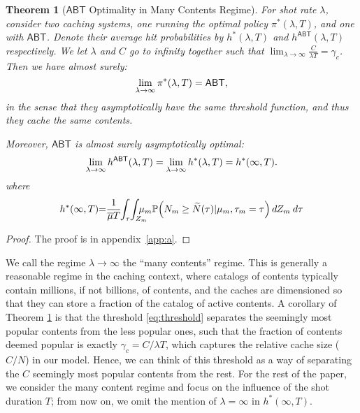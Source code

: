 \documentclass[10pt, conference, letterpaper]{IEEEtran}
\newcommand{\ABT}{\textsf{ABT}}
\newcommand{\prob}[1]{\mathbb{P}\!\left(#1\right)}
\newtheorem{theorem}{Theorem}
\begin{document}
\begin{theorem}[$\textsf{ABT}$ Optimality in  Many Contents Regime]\label{th:ABT}
For shot rate $\lambda$, consider two caching systems, one running the optimal policy $\pi^*(\lambda,T)$, and one with $\ABT$. Denote their average hit probabilities by $h^*(\lambda,T)$ and $h^{\ABT}(\lambda,T)$ respectively.
We let $\lambda$ and $C$ go to infinity together such that $\lim_{\lambda\to\infty}\frac{C}{\lambda T}=\gamma_c$. 
Then we have almost surely: \vspace{-0.09in}
\[
\lim_{\lambda\to\infty}\pi^*(\lambda,T)=\ABT,\vspace{-0.08in}
\]
in the sense that they asymptotically have the same threshold function, and thus they cache the same contents. 

Moreover, $\textsf{ABT}$ is almost surely asymptotically optimal:
\[
\lim_{\lambda\to\infty} h^{\ABT}(\lambda,T)=\lim_{\lambda\to\infty}h^*(\lambda,T)=h^*(\infty,T).\vspace{-0.1in}
\]
where \vspace{-0.08in}
$$h^*(\infty,T)\hspace{-0.04in}=\hspace{-0.04in}\frac{1}{\overline\mu T}\hspace{-0.04in}\int_{\tau}\hspace{-0.03in}\int_{Z_m}\hspace{-0.15in}\mu_m\prob{N_m\geq\widetilde N(\tau)|\mu_m,\tau_m=\tau}dZ_m\:d\tau$$
\end{theorem}
\begin{proof}
The proof is in appendix~\ref{app:a}.
\end{proof}



We call the regime $\lambda\to\infty$ the ``many contents'' regime. 
This is generally a reasonable regime in the caching context, where catalogs of contents typically contain millions, if not billions, of contents, and the caches are dimensioned so that they can store a fraction of the catalog of active contents.
A corollary of Theorem \ref{th:ABT} is that the threshold \eqref{eq:threshold} separates the seemingly most popular contents from the less popular ones, such that the fraction of contents deemed popular is exactly $\gamma_c=C/\lambda T$, which captures the relative cache size ($C/N$) in our model. Hence, we can think of this threshold as a way of separating the $C$ seemingly most popular contents from the rest. For the rest of the paper, we consider the many content regime and focus on the influence of the shot duration $T$; from now on, we omit the mention of $\lambda=\infty$ in $h^*(\infty,T)$.
\end{document}
